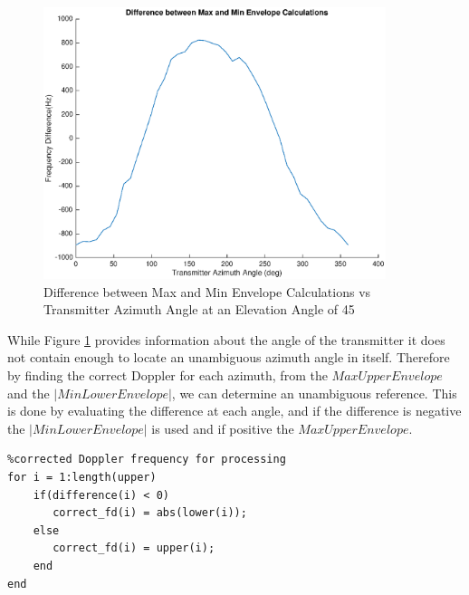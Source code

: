  \begin{figure}[b]
	\begin{center}
		\includegraphics[width=10cm]{images/results/Azimuth_angle_estimation_difference.eps}
		\caption{Difference between Max and Min Envelope Calculations vs Transmitter Azimuth Angle at an Elevation Angle of 45\textdegree}
		\label{fig:azimuth_estimation_difference}
	\end{center}
\end{figure}

While Figure \ref{fig:azimuth_estimation_difference} provides information about the angle of the transmitter it does not contain enough to locate an unambiguous azimuth angle in itself. Therefore by finding the correct Doppler for each azimuth, from the $Max Upper Envelope$ and the $| Min Lower Envelope |$, we can determine an unambiguous reference. This is done by evaluating the difference at each angle, and if the difference is negative the $| Min Lower Envelope |$ is used and if positive the $Max Upper Envelope$.

\begin{lstlisting}
%corrected Doppler frequency for processing
for i = 1:length(upper)
    if(difference(i) < 0)
       correct_fd(i) = abs(lower(i));
    else
       correct_fd(i) = upper(i);
    end
end
\end{lstlisting}

